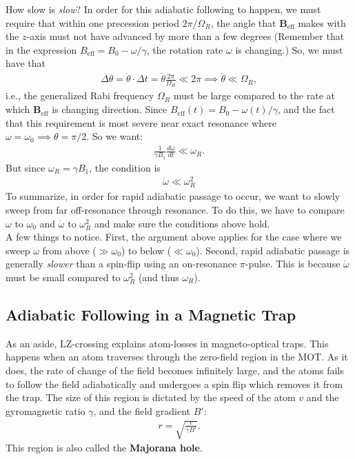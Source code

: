 \documentclass{book}
\theoremstyle{definition}
\newcommand{\f}[2]{\frac{#1}{#2}}
\begin{document}
How slow is \textit{slow}? In order for this adiabatic following to happen, we must require that within one precession period $2\pi/\Omega_R$, the angle that $\bm{B}_\text{eff}$ makes with the $z$-axis must not have advanced by more than a few degrees (Remember that in the expression $B_\text{eff} = B_0 - \omega/\gamma$, the rotation rate $\omega$ is changing.) So, we must have that
\begin{align*}
	\Delta \theta = \dot{\theta} \cdot \Delta t = \dot \theta \f{2\pi}{\Omega_R}  \ll 2\pi \implies \dot \theta \ll \Omega_R,
\end{align*}
i.e., the generalized Rabi frequency $\Omega_R$ must be large compared to the rate at which $\bm{B}_\text{eff}$ is changing direction. Since $B_\text{eff}(t)= B_0 - \omega(t)/\gamma$, and the fact that this requirement is most severe near exact resonance where $\omega = \omega_0 \implies \theta = \pi/2$. So we want:
\begin{align*}
	\f{1}{\gamma B_1} \f{d\omega}{dt} \ll \omega_R.
\end{align*}
But since $\omega_R = \gamma B_1$, the condition is 
\begin{align*}
	\boxed{\dot{\omega} \ll \omega_R^2}
\end{align*}
To summarize, in order for rapid adiabatic passage to occur, we want to slowly sweep from far off-resonance through resonance. To do this, we have to compare $\omega$ to $\omega_0$ and $\dot \omega$ to $\omega_R^2$ and make sure the conditions above hold. \\




A few things to notice. First, the argument above applies for the case where we sweep $\omega$ from above ($\gg \omega_0$) to below ($\ll \omega_0$). Second, rapid adiabatic passage is generally \textit{slower} than a spin-flip using an on-resonance $\pi$-pulse. This is because $\dot \omega$ must be small compared to $\omega_R^2$ (and thus $\omega_R$). 


\subsection{Adiabatic Following in a Magnetic Trap}


As an aside, LZ-crossing explains atom-losses in magneto-optical traps. This happens when an atom traverses through the zero-field region in the MOT. As it does, the rate of change of the field becomes infinitely large, and the atoms fails to follow the field adiabatically and undergoes a spin flip which removes it from the trap. The size of this region is dictated by the speed of the atom $v$ and the gyromagnetic ratio $\gamma$, and the field gradient $B'$:
\begin{align*}
	r = \sqrt{\f{v}{\gamma B'}}.
\end{align*}
This region is also called the \textbf{Majorana hole}.
\end{document}
